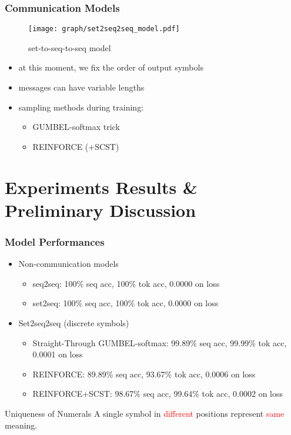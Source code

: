 \documentclass[compress,mathserif,xcolor=dvipsnames,svgnames,aspectratio=43]{beamer}
\begin{document}
\begin{frame}[c]
  \frametitle{Communication Models}
  \begin{figure}[!ht]
    \centering
    \texttt{[image: graph/set2seq2seq\_model.pdf]}
    \caption{set-to-seq-to-seq model}
    \label{fig:3set2seq2seq_model}
  \end{figure}
  \vspace{-0.25in}
  \begin{itemize}
    \item at this moment, we fix the order of output symbols
    \item messages can have variable lengths
    \item sampling methods during training: 
      \begin{itemize}
        \item GUMBEL-softmax trick
        \item REINFORCE (+SCST)
      \end{itemize}
  \end{itemize}
\end{frame}

\section{Experiments Results \& Preliminary Discussion}

\begin{frame}[c]
  \frametitle{Model Performances}
  \begin{itemize}
    \item Non-communication models
      \begin{itemize}
        \item seq2seq: 100\% seq acc, 100\% tok acc, 0.0000 on loss 
        \item set2seq: 100\% seq acc, 100\% tok acc, 0.0000 on loss
      \end{itemize}
    \item Set2seq2seq (discrete symbols)
      \begin{itemize}
        \item Straight-Through GUMBEL-softmax: 99.89\% seq acc, 99.99\% tok acc, 0.0001 on loss
        \item REINFORCE: 89.89\% seq acc, 93.67\% tok acc, 0.0006 on loss
        \item REINFORCE+SCST: 98.67\% seq acc, 99.64\% tok acc, 0.0002 on loss
      \end{itemize}
  \end{itemize}

  \begin{block}{Uniqueness of Numerals}
    A single symbol in \textcolor{red}{different} positions represent \textcolor{red}{same} meaning.
  \end{block}
\end{frame}
\end{document}
